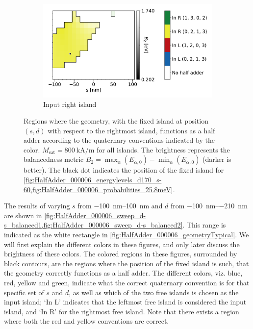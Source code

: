 \documentclass[11pt,a4paper,english,twoside]{article}
\begin{document}
\begin{figure}
\begin{subfigure}[t]{0.594\textwidth}
        \includegraphics[width=\textwidth]{Figures/half_adder/sweep/000006_d-s/table(d100-210_10,s-100-100_10)_balanced2_R.pdf}
        \caption{Input right island}
    \label{fig:HalfAdder_000006_sweep_d-s_balanced2-R}
    \end{subfigure}
    \caption{Regions where the geometry, with the fixed island at position $(s, d)$ with respect to the rightmost island, functions as a half adder according to the quaternary conventions indicated by the color. $M_\mathrm{sat} = \SI{800}{\kilo\ampere\per\metre}$ for all islands. The brightness represents the balancedness metric $B_2 = \max_\alpha(E_{\alpha,0}) - \min_\alpha(E_{\alpha,0})$ (darker is better). The black dot indicates the position of the fixed island for \cref{fig:HalfAdder_000006_energylevels_d170_s-60,fig:HalfAdder_000006_probabilities_25.8meV}.}
    \label{fig:HalfAdder_000006_sweep_d-s_balanced2}
\end{figure}
The results of varying $s$ from \SIrange{-100}{100}{\nano\metre} and $d$ from \SIrange{-100}{-210}{\nano\metre} are shown in \cref{fig:HalfAdder_000006_sweep_d-s_balanced1,fig:HalfAdder_000006_sweep_d-s_balanced2}. This range is indicated as the white rectangle in \cref{fig:HalfAdder_000006_geometryTypical}. We will first explain the different colors in these figures, and only later discuss the brightness of these colors. The colored regions in these figures, surrounded by black contours, are the regions where the position of the fixed island is such, that the geometry correctly functions as a half adder. The different colors, viz. blue, red, yellow and green, indicate what the correct quaternary convention is for that specific set of $s$ and $d$, as well as which of the two free islands is chosen as the input island; `In L' indicates that the leftmost free island is considered the input island, and `In R' for the rightmost free island. Note that there exists a region where both the red and yellow conventions are correct. \par
\end{document}
